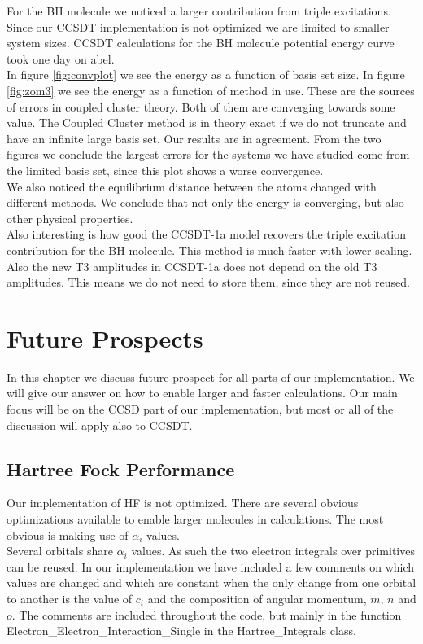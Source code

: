 \documentclass[a4paper,norsk,11pt,twoside]{report}
\begin{document}
For the BH molecule we noticed a larger contribution from triple excitations. Since our CCSDT implementation is not optimized we are limited to smaller system sizes. CCSDT calculations for the BH molecule potential energy curve took one day on abel. \\

In figure \ref{fig:convplot} we see the energy as a function of basis set size. In figure \ref{fig:zom3} we see the energy as a function of method in use. These are the sources of errors in coupled cluster theory. Both of them are converging towards some value. The Coupled Cluster method is in theory exact if we do not truncate and have an infinite large basis set. Our results are in agreement. From the two figures we conclude the largest errors for the systems we have studied come from the limited basis set, since this plot shows a worse convergence. \\

We also noticed the equilibrium distance between the atoms changed with different methods. We conclude that not only the energy is converging, but also other physical properties. \\

Also interesting is how good the CCSDT-1a model recovers the triple excitation contribution for the BH molecule. This method is much faster with lower scaling. Also the new T3 amplitudes in CCSDT-1a does not depend on the old T3 amplitudes. This means we do not need to store them, since they are not reused. 

\chapter{Future Prospects}
In this chapter we discuss future prospect for all parts of our implementation. We will give our answer on how to enable larger and faster calculations. Our main focus will be on the CCSD part of our implementation, but most or all of the discussion will apply also to CCSDT. 

\section{Hartree Fock Performance}
Our implementation of HF is not optimized. There are several obvious optimizations available to enable larger molecules in calculations. The most obvious is making use of $\alpha_i$ values. \\

Several orbitals share $\alpha_i$ values. As such the two electron integrals over primitives can be reused. In our implementation we have included a few comments on which values are changed and which are constant when the only change from one orbital to another is the value of $c_i$ and the composition of angular momentum, $m$, $n$ and $o$. The comments are included throughout the code, but mainly in the function Electron\_Electron\_Interaction\_Single in the Hartree\_Integrals class. \\
\end{document}
